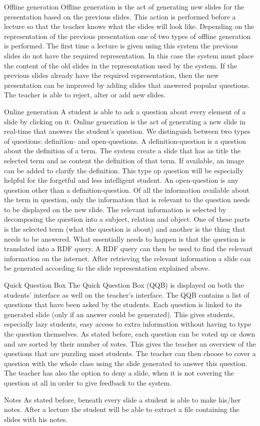 \documentclass[11pt]{article}
\begin{document}
Offline generation
Offline generation is the act of generating new slides for the presentation based on the previous slides. This action is performed before a lecture so that the teacher knows what the slides will look like. Depending on the representation of the previous presentation one of two types of offline generation is performed. The first time a lecture is given using this system the previous slides do not have the required representation. In this case the system must place the content of the old slides in the representation used by the system. If the previous slides already have the required representation, then the new presentation can be improved by adding slides that answered popular questions. The teacher is able to reject, alter or add new slides.

Online generation
A student is able to ask a question about every element of a slide by clicking on it. Online generation is the act of generating a new slide in real-time that answers the student’s question. We distinguish between two types of questions: definition- and open-questions. 
A definition-question is a question about the definition of a term. The system create a slide that has as title the selected term and as content the definition of that term. If available, an image can be added to clarify the definition. This type op question will be especially helpful for the forgetful and less intelligent student. 
An open-question is any question other than a definition-question. Of all the information available about the term in question, only the information that is relevant to the question needs to be displayed on the new slide. The relevant information is selected by decomposing the question into a subject, relation and object. One of these parts is the selected term (what the question is about) and another is the thing that needs to be answered. What essentially needs to happen is that the question is translated into a RDF query. A RDF query can then be used to find the relevant information on the internet. After retrieving the relevant information a slide can be generated according to the slide representation explained above.

Quick Question Box
The Quick Question Box (QQB) is displayed on both the students’ interface as well on the teacher’s interface. The QQB contains a list of questions that have been asked by the students. Each question is linked to its generated slide (only if an answer could be generated). This gives students, especially lazy students, easy access to extra information without having to type the question themselves. As stated before, each question can be voted up or down and are sorted by their number of votes. This gives the teacher an overview of the questions that are puzzling most students. The teacher can then choose to cover a question with the whole class using the slide generated to answer this question. The teacher has also the option to deny a slide, when it is not covering the question at all in order to give feedback to the system.

Notes
As stated before, beneath every slide a student is able to make his/her notes. After a lecture the student will be able to extract a file containing the slides with his notes. 
\end{document}
